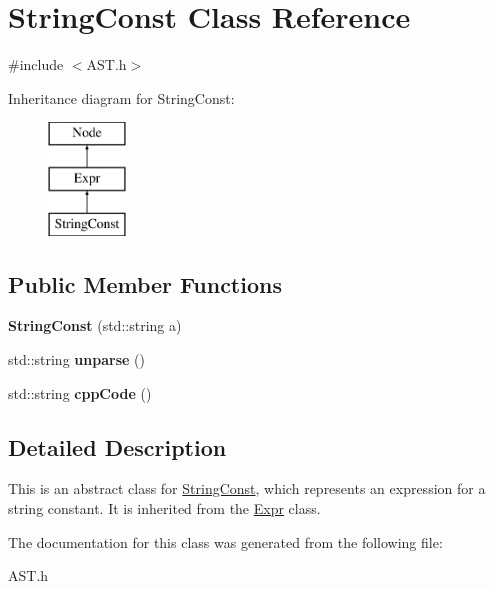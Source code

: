 \hypertarget{class_string_const}{}\section{String\+Const Class Reference}
\label{class_string_const}


{\ttfamily \#include $<$A\+S\+T.\+h$>$}

Inheritance diagram for String\+Const\+:\begin{figure}[H]
\begin{center}
\leavevmode
\includegraphics[height=3.000000cm]{class_string_const}
\end{center}
\end{figure}
\subsection*{Public Member Functions}
\begin{DoxyCompactItemize}
\item 
\hypertarget{class_string_const_a6cd0da8706c9d75b21df544030b2ec80}{}{\bfseries String\+Const} (std\+::string a)\label{class_string_const_a6cd0da8706c9d75b21df544030b2ec80}

\item 
\hypertarget{class_string_const_ac826c1ebd486a1dd4ab971e2b5ee9e8c}{}std\+::string {\bfseries unparse} ()\label{class_string_const_ac826c1ebd486a1dd4ab971e2b5ee9e8c}

\item 
\hypertarget{class_string_const_a145675b9bebadf39646f03b95167ab3b}{}std\+::string {\bfseries cpp\+Code} ()\label{class_string_const_a145675b9bebadf39646f03b95167ab3b}

\end{DoxyCompactItemize}


\subsection{Detailed Description}
This is an abstract class for \hyperlink{class_string_const}{String\+Const}, which represents an expression for a string constant. It is inherited from the \hyperlink{class_expr}{Expr} class. 

The documentation for this class was generated from the following file\+:\begin{DoxyCompactItemize}
\item 
A\+S\+T.\+h\end{DoxyCompactItemize}
